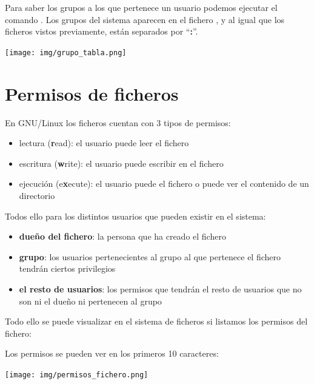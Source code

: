 \documentclass{../../../yukibook.cls/yukibook}
\begin{document}
Para saber los grupos a los que pertenece un usuario podemos ejecutar el comando . Los grupos del sistema aparecen en el fichero , y al igual que los ficheros vistos previamente, están separados por “\textbf{:}”.

\begin{center}
  \texttt{[image: img/grupo\_tabla.png]}
\end{center}

\section{Permisos de ficheros}
En GNU/Linux los ficheros cuentan con 3 tipos de permisos:
\begin{itemize}
    \item lectura (\textbf{r}ead): el usuario puede leer el fichero
    \item escritura (\textbf{w}rite): el usuario puede escribir en el fichero
    \item ejecución (e\textbf{x}ecute): el usuario puede el fichero o puede ver el contenido de un directorio
\end{itemize}


Todos ello para los distintos usuarios que pueden existir en el sistema:
\begin{itemize}
    \item \textbf{dueño del fichero}: la persona que ha creado el fichero
    \item \textbf{grupo}: los usuarios pertenecientes al grupo al que pertenece el fichero tendrán ciertos privilegios
    \item \textbf{el resto de usuarios}: los permisos que tendrán el resto de usuarios que no son ni el dueño ni pertenecen al grupo
\end{itemize}

Todo ello se puede visualizar en el sistema de ficheros si listamos los permisos del fichero:


Los permisos se pueden ver en los primeros 10 caracteres:

\begin{center}
  \texttt{[image: img/permisos\_fichero.png]}
\end{center}
\end{document}
